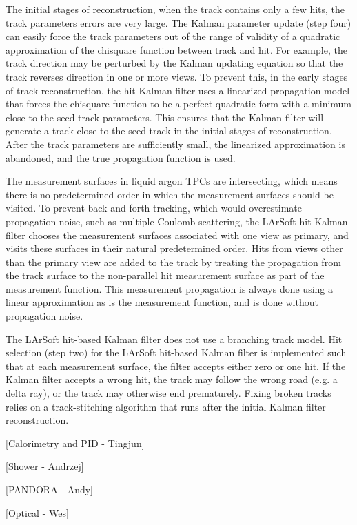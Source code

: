 \documentclass[12pt]{elsarticle}
\begin{document}
The initial
stages of reconstruction, when the track contains only a few hits, the
track parameters errors are very large. The Kalman parameter update
(step four) can easily force the track parameters out of the range of
validity of a quadratic approximation of the chisquare function
between track and hit.  For example, the track direction may be
perturbed by the Kalman updating equation so that the
track reverses direction in one or more views.  To prevent
this, in the early stages of track reconstruction, the hit Kalman
filter uses a linearized propagation model that forces the chisquare
function to be a perfect quadratic form with a minimum close to the
seed track parameters.  This ensures that the Kalman filter will
generate a track close to the seed track in the initial stages of
reconstruction.  After the track parameters are sufficiently small,
the linearized approximation is abandoned, and the true propagation
function is used.

The measurement surfaces in liquid argon TPCs are intersecting, which means there is no
predetermined order in which the measurement surfaces should be
visited.  To prevent back-and-forth tracking, which would overestimate
propagation noise, such as multiple Coulomb scattering, the LArSoft
hit Kalman filter chooses the measurement surfaces associated with one
view as primary, and visits these surfaces in their natural
predetermined order.  Hits from views other than the primary view are
added to the track by treating the propagation from the track surface
to the non-parallel hit measurement surface as part of the measurement
function.  This measurement propagation is always done using a linear
approximation as is the measurement function, and is done without
propagation noise.

The LArSoft hit-based Kalman filter
does not use a branching track model. Hit selection (step two) for the LArSoft hit-based Kalman filter is
implemented such that at each measurement surface, the filter accepts
either zero or one hit. If the Kalman filter accepts a wrong hit, the
track may follow the wrong road (e.g. a delta ray), or the track may
otherwise end prematurely.  Fixing broken tracks relies on
a track-stitching algorithm that runs after the initial Kalman
filter reconstruction.

[Calorimetry and PID - Tingjun]

[Shower - Andrzej]

[PANDORA - Andy]

[Optical - Wes]
\end{document}
